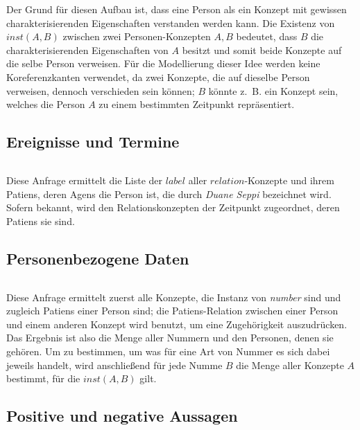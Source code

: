 Der Grund für diesen Aufbau ist, dass eine Person als ein Konzept mit gewissen charakterisierenden Eigenschaften verstanden werden kann.
Die Existenz von $inst(A, B)$ zwischen zwei Personen-Konzepten $A, B$ bedeutet, dass $B$ die charakterisierenden Eigenschaften von $A$ besitzt und somit beide Konzepte auf die selbe Person verweisen.
Für die Modellierung dieser Idee werden keine Koreferenzkanten verwendet, da zwei Konzepte, die auf dieselbe Person verweisen, dennoch verschieden sein können; $B$ könnte z.~B. ein Konzept sein, welches die Person $A$ zu einem bestimmten Zeitpunkt repräsentiert.

\subsection{Ereignisse und Termine}%
\label{sec:appendix:queries:events}

\inputminted{cypher}{data/evaluation/personTimeAction.cql}
Diese Anfrage ermittelt die Liste der $label$ aller $relation$-Konzepte und ihrem Patiens, deren Agens die Person ist, die durch \textit{Duane Seppi} bezeichnet wird.
Sofern bekannt, wird den Relationskonzepten der Zeitpunkt zugeordnet, deren Patiens sie sind.

\subsection{Personenbezogene Daten}%
\label{sec:appendix:queries:numbers}

\inputminted{cypher}{data/evaluation/numbers.cql}
Diese Anfrage ermittelt zuerst alle Konzepte, die Instanz von \textit{number} sind und zugleich Patiens einer Person sind;
die Patiens-Relation zwischen einer Person und einem anderen Konzept wird benutzt, um eine Zugehörigkeit auszudrücken.
Das Ergebnis ist also die Menge aller Nummern und den Personen, denen sie gehören.
Um zu bestimmen, um was für eine Art von Nummer es sich dabei jeweils handelt, wird anschließend für jede Numme $B$ die Menge aller Konzepte $A$ bestimmt, für die $inst(A, B)$ gilt.

\subsection{Positive und negative Aussagen}%
\label{sec:appendix:queries:neg}

